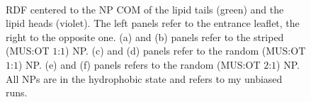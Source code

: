 \begin{figure}[p]
{		}\\%
		\caption{\acs{RDF} centered to the \acs{NP} \acs{COM} of the lipid tails (green) and the lipid heads (violet). The left panels refer to the entrance leaflet, the right to the opposite one. (a) and (b) panels refer to the striped (\acs{MUS}:\acs{OT} $1$:$1$) \acs{NP}. (c) and (d) panels refer to the random (\acs{MUS}:\acs{OT} $1$:$1$) \acs{NP}. (e) and (f) panels refers to the random (\acs{MUS}:\acs{OT} $2$:$1$) \acs{NP}. All \acp{NP} are in the hydrophobic state and refers to my unbiased runs.}%
		\label{fig:RDF}
\end{figure}


